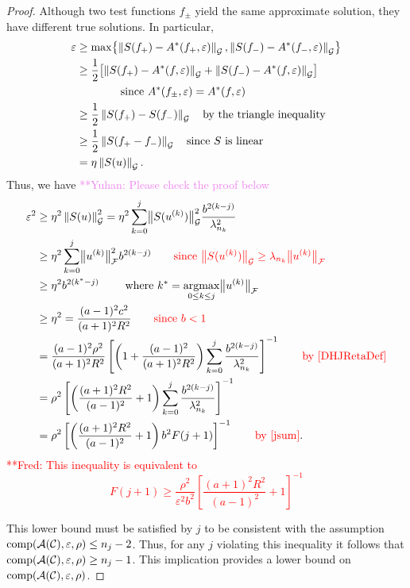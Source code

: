 \documentclass[graybox,footinfo]{svmult}
\newcommand{\DHJRnorm}[2][{}]{\ensuremath{\left \lVert #2 \right \rVert}_{#1}}
\newcommand{\DHJRbignorm}[2][{}]{\ensuremath{\bigl \lVert #2 \bigr \rVert}_{#1}}
\newcommand{\frednote}[1]{  {\textcolor{red}  {\mbox{**Fred:} #1}}}
\newcommand{\yuhannote}[1]{ {\textcolor{violet}  {\mbox{**Yuhan:} #1}}}
\begin{document}
\begin{proof}
Although two test functions $f_\pm$ yield the same approximate solution, they have different true solutions.  In particular,
\begin{align*}
\varepsilon &\ge \max \bigl\{\DHJRnorm[\calG]{S(f_+) - A^*(f_+,\varepsilon)}, \DHJRnorm[\calG]{S(f_-) - A^*(f_-,\varepsilon)} \bigr\} \\
&\ge \frac 12 \bigl[\DHJRnorm[\calG]{S(f_+) - A^*(f,\varepsilon)} + \DHJRnorm[\calG]{S(f_-) - A^*(f,\varepsilon)}  \bigr] \\
&\qquad \qquad \text{since } A^*(f_\pm,\varepsilon) = A^*(f,\varepsilon) \\
&\ge \frac 12 \DHJRnorm[\calG]{S(f_+) - S(f_-)} \quad \text{by the triangle inequality}\\
&\ge \frac 12 \DHJRnorm[\calG]{S(f_+ - f_-)} \quad \text{since $S$ is linear}\\
&= \eta \DHJRnorm[\calG]{S(u)}.
\end{align*}
Thus, we have \yuhannote{Please check the proof below}
\begin{align*}
\varepsilon^2  & \ge \eta^2 \DHJRnorm[\calG]{S(u)}^2= 
\eta^2 \sum_{k=0}^{j} \DHJRbignorm[\calG]{S(u^{(k)})}^2  \frac{b^{2(k-j)}}{\lambda_{n_k}^2}\\
& \ge \eta^2 
\sum_{k=0}^{j} \DHJRbignorm[\calF]{u^{(k)}}^2 
b^{2(k-j)} 
\qquad {\color{red} \text{since } \DHJRbignorm[\calG]{S(u^{(k)})} \ge \lambda_{n_k} \DHJRbignorm[\calF]{u^{(k)}} }\\
& \ge  \eta^2 b^{2(k^{*}-j)} \qquad \text{ where } k^* = \argmax_{0 \le k \le j} \DHJRbignorm[\calF]{u^{(k)}} \\
& \ge \eta^2 = \frac{(a-1)^2c^2}{(a+1)^2R^2} 
\qquad {\color{red} \text{since } b < 1}\\
&
=\frac{(a-1)^2 \rho^2}{(a+1)^2R^2}\left[\left(1+\frac{(a-1)^2}{(a+1)^{2} R^2 }\right)\sum_{k=0}^j \frac{b^{2(k-j)}}{\lambda_{n_{k}}^2}\right]^{-1} 
\qquad {\color{red} \text{by \eqref{DHJRetaDef}}}\\
& =  \rho^2 \left[\left(\frac{(a+1)^{2} R^2 }{(a-1)^2} + 1\right)\sum_{k=0}^j \frac{b^{2(k-j)}}{\lambda_{n_{k}}^2}\right]^{-1} \\
& = \rho^2 \left[\left(\frac{(a+1)^{2} R^2 }{(a-1)^2} + 1\right) b^2F(j+1)\right]^{-1} 
\qquad {\color{red} \text{by \eqref{jsum}}}.
\end{align*}
\frednote{This inequality is equivalent to 
\begin{equation}
    F(j+1) \ge  \frac{\rho^2}{\varepsilon^2 b^2}
\left[\frac{(a+1)^{2} R^2 }{(a-1)^2} + 1\right]^{-1}
\end{equation}
}

This lower bound must be satisfied by $j$ to be consistent with the assumption $\textup{comp}({\mathcal{A}}({\mathcal{C}}),\varepsilon,\rho) \le n_j - 2$.  Thus, for any $j$ violating this inequality it follows that $\textup{comp}({\mathcal{A}}({\mathcal{C}}),\varepsilon,\rho) \ge n_j - 1$.  This implication provides a lower bound on $\textup{comp}({\mathcal{A}}({\mathcal{C}}),\varepsilon,\rho)$.
\end{proof}
\end{document}
